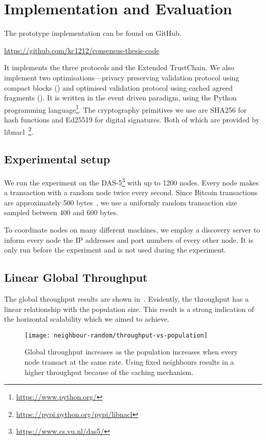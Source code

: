 \section{Implementation and Evaluation}

The prototype implementation can be found on GitHub.
\begin{displayquote}
\url{https://github.com/kc1212/consensus-thesis-code}
\end{displayquote}
It implements the three protocols and the Extended TrustChain.
We also implement two optimisations---privacy preserving validation protocol using compact blocks ()
and optimised validation protocol using cached agreed fragments ().
It is written in the event driven paradigm, using the Python programming language\footnote{\url{https://www.python.org/}}.
The cryptography primitives we use are SHA256 for hash functions and Ed25519 for digital signatures.
Both of which are provided by libnacl~\footnote{\url{https://pypi.python.org/pypi/libnacl}}.


\subsection{Experimental setup}
\label{sec:experimental-setup}

We run the experiment on the DAS-5\footnote{\url{https://www.cs.vu.nl/das5/}} with up to 1200 nodes.
Every node makes a transaction with a random node twice every second.
Since Bitcoin transactions are approximately 500 bytes~\cite{txsize},
we use a uniformly random transaction size sampled between 400 and 600 bytes.

To coordinate nodes on many different machines,
we employ a discovery server to inform every node the IP addresses and port numbers of every other node.
It is only run before the experiment and is not used during the experiment.

\subsection{Linear Global Throughput}

The global throughput results are shown in~.
Evidently, the throughput has a linear relationship with the population size.
This result is a strong indication of the horizontal scalability which we aimed to achieve.

\begin{figure}[h]
  \centering
  \texttt{[image: neighbour-random/throughput-vs-population]}
  \caption{Global throughput increases as the population increases when every node transact at the same rate.
  Using fixed neighbours results in a higher throughput because of the caching mechanism.}
  \label{fig:global-throughput}
\end{figure}


